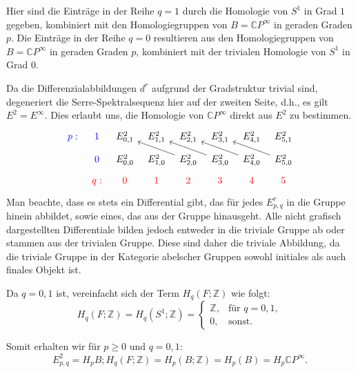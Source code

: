 \documentclass[12pt]{article}
\numberwithin{conj}{section}
\begin{document}
    Hier sind die Einträge in der Reihe $q = 1$ durch die Homologie von $S^{1}$ in
    Grad $1$ gegeben, kombiniert mit den Homologiegruppen von $B = \mathbb{C}P^{\infty}$
    in geraden Graden $p$. Die Einträge in der Reihe $q = 0$ resultieren aus den
    Homologiegruppen von $B = \mathbb{C}P^{\infty}$ in geraden Graden $p$, kombiniert
    mit der trivialen Homologie von $S^{1}$ in Grad $0$.

    Da die Differenzialabbildungen $d^{r}$ aufgrund der Gradstruktur trivial sind,
    degeneriert die Serre-Spektralsequenz hier auf der zweiten Seite, d.h., es gilt
    $E^{2} = E^{\infty}$. Dies erlaubt uns, die Homologie von $\mathbb{C}P^{\infty}$
    direkt aus $E^{2}$ zu bestimmen.
    \[
        \begin{tikzcd}
            [sep=tiny] {\color{blue}p:} & {\color{blue}1} & {E^2_{0,1}} & {E^2_{1,1}} &
            {E^2_{2,1}} & {E^2_{3,1}} & {E^2_{4,1}} & {E^2_{5,1}} \\ & {\color{blue}0}
            & {E^2_{0,0}} & {E^2_{1,0}} & {E^2_{2,0}} & {E^2_{3,0}} & {E^2_{4,0}} & {E^2_{5,0}}
            \\ & {\color{red}q:} & {\color{red}0} & {\color{red}1} & {\color{red}2} & {\color{red}3}
            & {\color{red}4} & {\color{red}5} \arrow[from=2-5, to=1-3] \arrow[from=2-6,
            to=1-4] \arrow[from=2-7, to=1-5] \arrow[from=2-8, to=1-6]
        \end{tikzcd}
    \]
    Man beachte, dass es stets ein Differential gibt, das für jedes $E^{r}_{p,q}$
    in die Gruppe hinein abbildet, sowie eines, das aus der Gruppe hinausgeht. Alle
    nicht grafisch dargestellten Differentiale bilden jedoch entweder in die triviale
    Gruppe ab oder stammen aus der trivialen Gruppe. Diese sind daher die triviale
    Abbildung, da die triviale Gruppe in der Kategorie abelscher Gruppen sowohl initiales
    als auch finales Objekt ist.

    Da $q = 0,1$ ist, vereinfacht sich der Term $H_{q}(F;\mathbb{Z})$ wie folgt:
    \[
        H_{q}(F;\mathbb{Z}) = H_{q}(S^{1};\mathbb{Z}) =
        \begin{cases}
            \mathbb{Z}, & \text{für } q = 0,1, \\
            0,          & \text{sonst}.
        \end{cases}
    \]

    Somit erhalten wir für $p \geq 0$ und $q = 0,1$:
    \[
        E^{2}_{p,q}= H_{p} B; H_{q}(F;\mathbb{Z})  = H_{p}(B;\mathbb{Z}) =
        H_{p}(B) = H_{p} \mathbb{C}P^{\infty} .
    \]
\end{document}

